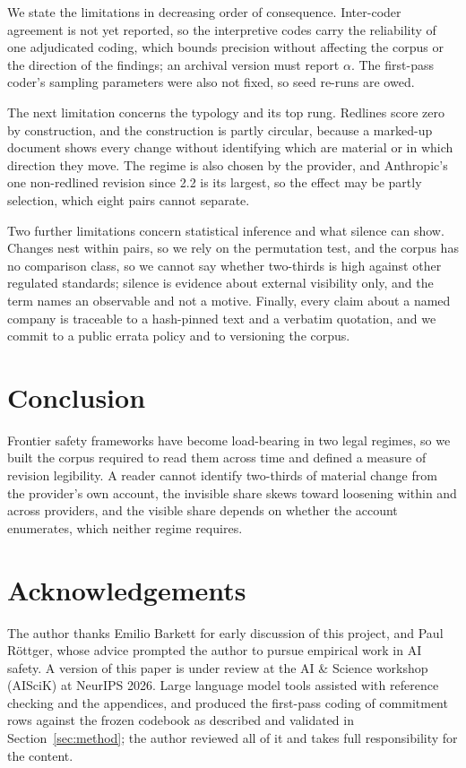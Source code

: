 \documentclass{article}
\begin{document}
We state the limitations in decreasing order of consequence. Inter-coder agreement is not yet reported, so the interpretive codes carry the reliability of one adjudicated coding, which bounds precision without affecting the corpus or the direction of the findings; an archival version must report $\alpha$. The first-pass coder's sampling parameters were also not fixed, so seed re-runs are owed.

The next limitation concerns the typology and its top rung. Redlines score zero by construction, and the construction is partly circular, because a marked-up document shows every change without identifying which are material or in which direction they move. The regime is also chosen by the provider, and Anthropic's one non-redlined revision since 2.2 is its largest, so the effect may be partly selection, which eight pairs cannot separate.

Two further limitations concern statistical inference and what silence can show. Changes nest within pairs, so we rely on the permutation test, and the corpus has no comparison class, so we cannot say whether two-thirds is high against other regulated standards; silence is evidence about external visibility only, and the term names an observable and not a motive. Finally, every claim about a named company is traceable to a hash-pinned text and a verbatim quotation, and we commit to a public errata policy and to versioning the corpus.

\section{Conclusion}
\label{sec:conclusion}

Frontier safety frameworks have become load-bearing in two legal regimes, so we built the corpus required to read them across time and defined a measure of revision legibility. A reader cannot identify two-thirds of material change from the provider's own account, the invisible share skews toward loosening within and across providers, and the visible share depends on whether the account enumerates, which neither regime requires.

\section*{Acknowledgements}
The author thanks Emilio Barkett for early discussion of this project, and Paul R\"ottger, whose advice prompted the author to pursue empirical work in AI safety. A version of this paper is under review at the AI \& Science workshop (AISciK) at NeurIPS 2026. Large language model tools assisted with reference checking and the appendices, and produced the first-pass coding of commitment rows against the frozen codebook as described and validated in Section~\ref{sec:method}; the author reviewed all of it and takes full responsibility for the content.
\end{document}
